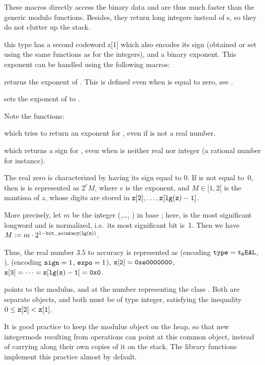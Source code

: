 These macros directly access the binary data and are thus much faster than
the generic modulo functions. Besides, they return long integers instead of
s, so they do not clutter up the stack.

this type has a second codeword z[1] which also encodes its sign (obtained
or set using the same functions as for the integers), and a binary
exponent. This exponent can be handled using the following macros:

 returns the exponent of .
This is defined even when  is equal to zero, see
.

 sets the exponent of  to .

\noindent Note the functions:

 which tries to return an exponent for ,
even if  is not a real number.

 which returns a sign for , even when
 is neither real nor integer (a rational number for instance).

The real zero is characterized by having its sign equal to 0. If  is
not equal to~0, then is is represented as $2^e M$, where $e$ is the exponent,
and $M\in [1, 2[$ is the mantissa of $z$, whose digits are stored in
${\tt z[2]},\dots, {\tt z[lg(z)-1]}$.

More precisely, let $m$ be the integer (,\dots, )
in base ; here,  is the most significant
longword and is normalized, i.e.~its most significant bit is~1. Then we have
$M := m \cdot 2^{1 - {\tt bit\_accuracy(lg(z))}}$.

Thus, the real number $3.5$ to accuracy  is
represented as  (encoding ${\tt type} = {\tt t_REAL}$, ),
 (encoding ${\tt sign} = 1$, ${\tt expo} = 1$), ${\tt z[2]} =
{\tt 0xe0000000}$, ${\tt z[3]} =\dots = {\tt z[lg(z)-1]} = {\tt 0x0}$.

 points to the modulus, and  at the number representing
the class . Both are separate  objects, and both must be of
type integer, satisfying the inequality $0 \le {\tt z[2]} < {\tt z[1]}$.

It is good practice to keep the modulus object on the heap, so that new
integermods resulting from operations can point at this common object,
instead of carrying along their own copies of it on the stack. The library
functions implement this practice almost by default.

